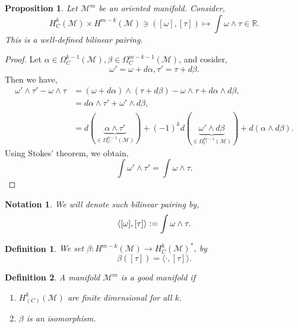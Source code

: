\documentclass[10pt]{article}
\newtheorem{proposition}{Proposition}[section]
\newtheorem{definition}{Definition}[section]
\newtheorem{notation}{Notation}[section]
\newcommand{\defeq}{\vcentcolon=}
\newcommand{\R}[0]{\mathbb{R}}
\newcommand{\M}[0]{\mathcal{M}}
\begin{document}
\begin{proposition}
  Let $\M^m$ be an oriented manifold. Consider,
  \begin{equation*}
    H_C^k(\M)\times H^{m-k}(\M)\ni([\omega],[\tau])\mapsto\int\omega\wedge\tau\in\R.
  \end{equation*}
  This is a well-defined bilinear pairing.
\end{proposition}
\begin{proof}
  Let $\alpha\in\Omega_C^{k-1}(\M),\beta\in\Omega^{m-k-1}_C(\M)$, and cosider,
  \begin{equation*}
    \omega'=\omega+d\alpha,\tau'=\tau+d\beta.
  \end{equation*}
  Then we have,
  \begin{align*}
    \omega'\wedge\tau'-\omega\wedge\tau&= (\omega+d\alpha)\wedge(\tau+d\beta)-\omega\wedge\tau+d\alpha\wedge d\beta,\\
    & = d\alpha\wedge\tau'+\omega'\wedge d\beta,\\
    & = d(\underbrace{\alpha\wedge\tau'}_{\in\Omega_C^{n-1}(\M)})+(-1)^kd(\underbrace{\omega'\wedge d\beta}_{\in\Omega^{m-1}_C(\M)})+d(\alpha\wedge d\beta).
  \end{align*}
  Using Stokes' theorem, we obtain,
  \begin{equation*}
    \int\omega'\wedge\tau' = \int\omega\wedge\tau.
  \end{equation*}
\end{proof}

\begin{notation}
  We will denote such bilinear pairing by,
  \begin{equation*}
    \langle[\omega],[\tau]\rangle\defeq\int\omega\wedge\tau.
  \end{equation*}
\end{notation}

\begin{definition}
  We set $\beta:H^{m-k}(\M)\to H_C^k(\M)^*$, by
  \begin{equation*}
    \beta([\tau]) = \langle\cdot,[\tau]\rangle.
  \end{equation*}
\end{definition}

\begin{definition}
  A manifold $\M^m$ is a good manifold if 
  \begin{enumerate}
    \item $H_{(C)}^k(\M)$ are finite dimensional for all $k$.
    \item $\beta$ is an isomorphism.
  \end{enumerate}
\end{definition}
\end{document}
